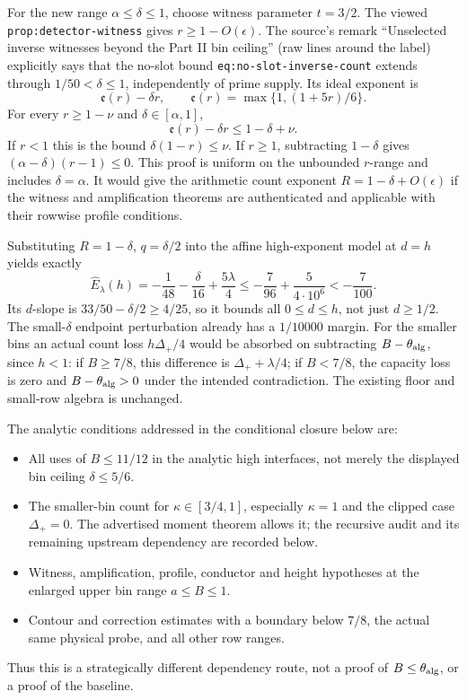 \documentclass[12pt]{article}
\begin{document}
For the new range \(\alpha\le\delta\le1\), choose witness parameter
\(t=3/2\).  The viewed \nolinkurl{prop:detector-witness} gives
\(r\ge1-O(\epsilon)\).  The source's remark
``Unselected inverse witnesses beyond the Part II bin ceiling''
(raw lines around the label) explicitly says that the no-slot bound
\nolinkurl{eq:no-slot-inverse-count} extends through
\(1/50<\delta\le1\), independently of prime supply.
Its ideal exponent is
\[
 \mathfrak e(r)-\delta r,\qquad
 \mathfrak e(r)=\max\{1,(1+5r)/6\}.
\]
For every \(r\ge1-\nu\) and \(\delta\in[\alpha,1]\),
\[
 \mathfrak e(r)-\delta r\le1-\delta+\nu.
\]
If \(r<1\) this is the bound \(\delta(1-r)\le\nu\).
If \(r\ge1\), subtracting \(1-\delta\) gives
\((\alpha-\delta)(r-1)\le0\).
This proof is uniform on the unbounded \(r\)-range and includes
\(\delta=\alpha\).  It would give the arithmetic count exponent
\(R=1-\delta+O(\epsilon)\) if the witness and amplification
theorems are authenticated and applicable with their rowwise
profile conditions.

Substituting \(R=1-\delta\), \(q=\delta/2\) into the affine
high-exponent model at \(d=h\) yields exactly
\[
 \widehat E_\lambda(h)
  =-\frac1{48}-\frac{\delta}{16}+\frac{5\lambda}{4}
  \le-\frac7{96}+\frac{5}{4\cdot10^6}<-\frac7{100}.
\]
Its \(d\)-slope is \(33/50-\delta/2\ge4/25\), so it bounds
all \(0\le d\le h\), not just \(d\ge1/2\).
The small-\(\delta\) endpoint perturbation already has a
\(1/10000\) margin.  For the smaller bins an actual count loss
\(h\Delta_+/4\) would be absorbed on subtracting
\(B-\theta_{\rm alg}\), since \(h<1\):
if \(B\ge7/8\), this difference is \(\Delta_++\lambda/4\);
if \(B<7/8\), the capacity loss is zero and \(B-\theta_{\rm alg}>0\)
under the intended contradiction.  The existing floor and small-row
algebra is unchanged.

The analytic conditions addressed in the conditional closure below are:
\begin{itemize}
\item All uses of \(B\le11/12\) in the analytic high interfaces,
not merely the displayed bin ceiling \(\delta\le5/6\).
\item The smaller-bin count for \(\kappa\in[3/4,1]\), especially
\(\kappa=1\) and the clipped case \(\Delta_+=0\).
The advertised moment theorem allows it; the recursive audit
and its remaining upstream dependency are recorded below.
\item Witness, amplification, profile, conductor and height
hypotheses at the enlarged upper bin range \(a\le B\le1\).
\item Contour and correction estimates with a boundary below
\(7/8\), the actual same physical probe, and all other row ranges.
\end{itemize}
Thus this is a strategically different dependency route, not a
proof of \(B\le\theta_{\rm alg}\), or a proof of the baseline.
\end{document}
